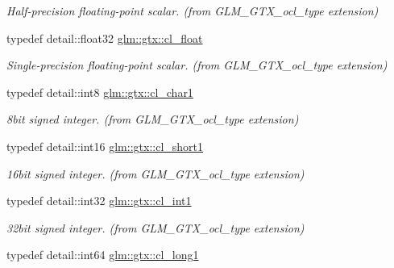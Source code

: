 \begin{DoxyCompactItemize}
\begin{DoxyCompactList}\small\item\em Half-\/precision floating-\/point scalar. (from G\+L\+M\+\_\+\+G\+T\+X\+\_\+ocl\+\_\+type extension) \end{DoxyCompactList}\item 
\hypertarget{group__gtx__ocl__type_ga2e9676fd20c91f935fb4c8dc99deb088}{}typedef detail\+::float32 \hyperlink{group__gtx__ocl__type_ga2e9676fd20c91f935fb4c8dc99deb088}{glm\+::gtx\+::cl\+\_\+float}\label{group__gtx__ocl__type_ga2e9676fd20c91f935fb4c8dc99deb088}

\begin{DoxyCompactList}\small\item\em Single-\/precision floating-\/point scalar. (from G\+L\+M\+\_\+\+G\+T\+X\+\_\+ocl\+\_\+type extension) \end{DoxyCompactList}\item 
\hypertarget{group__gtx__ocl__type_ga2d617e5164d9380453b6c8755e46b49f}{}typedef detail\+::int8 \hyperlink{group__gtx__ocl__type_ga2d617e5164d9380453b6c8755e46b49f}{glm\+::gtx\+::cl\+\_\+char1}\label{group__gtx__ocl__type_ga2d617e5164d9380453b6c8755e46b49f}

\begin{DoxyCompactList}\small\item\em 8bit signed integer. (from G\+L\+M\+\_\+\+G\+T\+X\+\_\+ocl\+\_\+type extension) \end{DoxyCompactList}\item 
\hypertarget{group__gtx__ocl__type_gafb97ab2b6a5500103a21194274cdfe90}{}typedef detail\+::int16 \hyperlink{group__gtx__ocl__type_gafb97ab2b6a5500103a21194274cdfe90}{glm\+::gtx\+::cl\+\_\+short1}\label{group__gtx__ocl__type_gafb97ab2b6a5500103a21194274cdfe90}

\begin{DoxyCompactList}\small\item\em 16bit signed integer. (from G\+L\+M\+\_\+\+G\+T\+X\+\_\+ocl\+\_\+type extension) \end{DoxyCompactList}\item 
\hypertarget{group__gtx__ocl__type_ga43fc75b74a5e18e4b5ba50196cb206b0}{}typedef detail\+::int32 \hyperlink{group__gtx__ocl__type_ga43fc75b74a5e18e4b5ba50196cb206b0}{glm\+::gtx\+::cl\+\_\+int1}\label{group__gtx__ocl__type_ga43fc75b74a5e18e4b5ba50196cb206b0}

\begin{DoxyCompactList}\small\item\em 32bit signed integer. (from G\+L\+M\+\_\+\+G\+T\+X\+\_\+ocl\+\_\+type extension) \end{DoxyCompactList}\item 
\hypertarget{group__gtx__ocl__type_gadc267970d16f79f46041f4edf5243fe5}{}typedef detail\+::int64 \hyperlink{group__gtx__ocl__type_gadc267970d16f79f46041f4edf5243fe5}{glm\+::gtx\+::cl\+\_\+long1}\label{group__gtx__ocl__type_gadc267970d16f79f46041f4edf5243fe5}


\end{DoxyCompactItemize}
